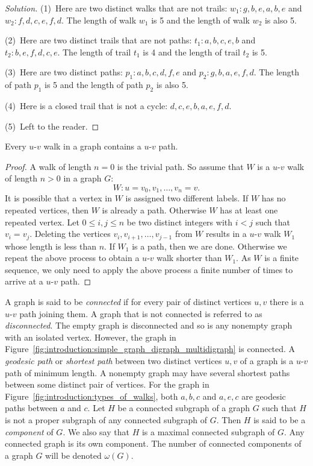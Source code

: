 \begin{proof}[Solution]
(1)~Here are two distinct walks that are not trails:
$w_1: g, b, e, a, b, e$ and $w_2: f, d, c, e, f, d$. The length of
walk $w_1$ is 5 and the length of walk $w_2$ is also 5.

(2)~Here are two distinct trails that are not paths:
$t_1: a,b,c,e,b$ and $t_2: b,e,f,d,c,e$. The length of trail $t_1$ is
4 and the length of trail $t_2$ is 5.

(3)~Here are two distinct paths: $p_1: a, b, c, d, f, e$ and
$p_2: g, b, a, e, f, d$. The length of path $p_1$ is 5 and the length
of path $p_2$ is also 5.

(4)~Here is a closed trail that is not a cycle: $d, c, e, b, a, e, f, d$.

(5)~Left to the reader.
\end{proof}

\begin{theorem}
\label{thm:introduction:every_walk_has_a_path}
Every $u$-$v$ walk in a graph contains a $u$-$v$ path.
\end{theorem}

\begin{proof}
A walk of length $n = 0$ is the trivial path. So assume that $W$ is a
$u$-$v$ walk of length $n > 0$ in a graph $G$:
\[
W: u = v_0, v_1, \dots, v_n = v.
\]
It is possible that a vertex in $W$ is assigned two different
labels. If $W$ has no repeated vertices, then $W$ is already a
path. Otherwise $W$ has at least one repeated vertex. Let
$0 \leq i,j \leq n$ be two distinct integers with $i < j$ such that
$v_i = v_j$. Deleting the vertices $v_i, v_{i+1}, \dots, v_{j-1}$ from
$W$ results in a $u$-$v$ walk $W_1$ whose length is less than $n$. If
$W_1$ is a path, then we are done. Otherwise we repeat the above
process to obtain a $u$-$v$ walk shorter than $W_1$. As $W$ is a
finite sequence, we only need to apply the above process a finite
number of times to arrive at a $u$-$v$ path.
\end{proof}

A graph is said to be
\emph{connected} if for
every pair of distinct vertices $u, v$ there is a $u$-$v$ path joining
them. A graph that is not connected is referred to as
\emph{disconnected}.
The empty graph is disconnected and so is any nonempty graph with an
isolated vertex. However, the graph in
Figure~\ref{fig:introduction:simple_graph_digraph_multidigraph} is
connected. A \emph{geodesic path} or
\emph{shortest path} between two distinct
vertices $u,v$ of a graph is a $u$-$v$ path of minimum length. A
nonempty graph may have several shortest paths between some distinct
pair of vertices. For the graph in
Figure~\ref{fig:introduction:types_of_walks}, both $a,b,c$ and $a,e,c$
are geodesic paths between $a$ and $c$. Let $H$ be a connected
subgraph of a graph $G$ such that $H$ is not a proper subgraph of any
connected subgraph of $G$. Then $H$ is said to be a
\emph{component} of $G$. We also say that $H$ is a
maximal connected subgraph of $G$. Any connected graph is its own
component. The number of connected components of a graph $G$ will be
denoted $\omega(G)$\index{$\omega$}.

